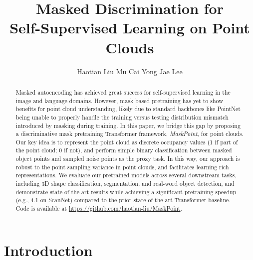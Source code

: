 \documentclass[runningheads]{llncs}
\begin{document}
\pagestyle{headings}
\mainmatter

\title{
Masked Discrimination for\\Self-Supervised Learning on Point Clouds
}

\def\methodname{MaskPoint}


\author{
Haotian Liu \quad
Mu Cai \quad
Yong Jae Lee
}



\maketitle


\begin{abstract}
Masked autoencoding has achieved great success for self-supervised learning in the image and language domains. However, mask based pretraining has yet to show benefits for point cloud understanding, likely due to standard backbones like PointNet being unable to properly handle the training versus testing distribution mismatch introduced by masking during training. In this paper, we bridge this gap by proposing a discriminative mask pretraining Transformer framework, \emph{\methodname{}}, for point clouds. Our key idea is to represent the point cloud as discrete occupancy values (1 if part of the point cloud; 0 if not), and perform simple binary classification between masked object points and sampled noise points as the proxy task. In this way, our approach is robust to the point sampling variance in point clouds, and facilitates learning rich representations. We evaluate our pretrained models across several downstream tasks, including 3D shape classification, segmentation, and real-word object detection, and demonstrate state-of-the-art results while achieving a significant pretraining speedup (e.g., 4.1 on ScanNet) compared to the prior state-of-the-art Transformer baseline. Code is available at \url{https://github.com/haotian-liu/MaskPoint}.
\end{abstract}

\section{Introduction}
\end{document}
